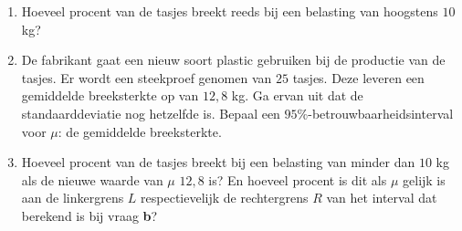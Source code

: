 \begin{enumerate}[label=(\alph*)]
    \item Hoeveel procent van de tasjes breekt reeds bij een belasting van hoogstens $10$ kg?
    \answer{

    }

    \item De fabrikant gaat een nieuw soort plastic gebruiken bij de productie van de tasjes.
    Er wordt een steekproef genomen van $25$ tasjes.
    Deze leveren een gemiddelde breeksterkte op van $12,8$ kg.
    Ga ervan uit dat de standaarddeviatie nog hetzelfde is.
    Bepaal een $95\%$-betrouwbaarheidsinterval voor $\mu$: de gemiddelde breeksterkte.
    \answer{

    }

    \item Hoeveel procent van de tasjes breekt bij een belasting van minder dan $10$ kg als de nieuwe waarde van $\mu$ $12,8$ is?
    En hoeveel procent is dit als $\mu$ gelijk is aan de linkergrens $L$ respectievelijk de rechtergrens $R$ van het interval dat berekend is bij vraag \textbf{b}?
    \answer{
    
    }
\end{enumerate}

